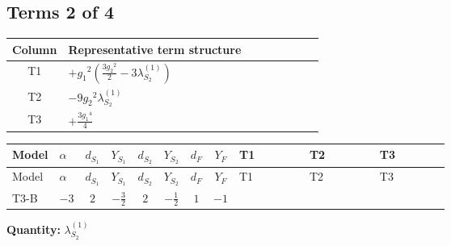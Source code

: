 \documentclass[8pt]{article}
\begin{document}
\begin{landscape}
\subsection*{Terms 2 of 4}
\begin{center}
\begin{tabular}{@{}c >{\raggedright\arraybackslash}p{0.82\linewidth}@{}}
\toprule
Column & Representative term structure \\
\midrule
T1 & \(\displaystyle +{g_1}^2 \left(\frac{3 {g_2}^2}{2}-3 {\lambda_{S_2}^{(1)}}\right)\) \\
\midrule
T2 & \(\displaystyle -9 {g_2}^2 {\lambda_{S_2}^{(1)}}\) \\
\midrule
T3 & \(\displaystyle +\frac{3 {g_1}^4}{4}\) \\
\midrule
\bottomrule
\end{tabular}
\end{center}
\smallskip
\tiny
\begin{longtable}{@{}llcccccc >{\raggedright\arraybackslash}p{0.21\linewidth} >{\raggedright\arraybackslash}p{0.21\linewidth} >{\raggedright\arraybackslash}p{0.21\linewidth}@{}}
\toprule
Model & $\alpha$ & $d_{S_1}$ & $Y_{S_1}$ & $d_{S_2}$ & $Y_{S_2}$ & $d_F$ & $Y_F$ & T1 & T2 & T3 \\
\midrule
\endfirsthead
\toprule
Model & $\alpha$ & $d_{S_1}$ & $Y_{S_1}$ & $d_{S_2}$ & $Y_{S_2}$ & $d_F$ & $Y_F$ & T1 & T2 & T3 \\
\midrule
\endhead
T3-B & $-3$ & $2$ & $-\frac{3}{2}$ & $2$ & $-\frac{1}{2}$ & $1$ & $-1$ & \scriptsize\adjustbox{max width=\linewidth}{$\begin{gathered} +{g_1}^2 \left(\frac{3 {g_2}^2}{2}-3 {\lambda_{S_2}^{(1)}}\right)\end{gathered}$} & \scriptsize\adjustbox{max width=\linewidth}{$\begin{gathered} -9 {g_2}^2 {\lambda_{S_2}^{(1)}}\end{gathered}$} & \scriptsize\adjustbox{max width=\linewidth}{$\begin{gathered} +\frac{3 {g_1}^4}{4}\end{gathered}$} \\
\midrule
\bottomrule
\end{longtable}
\clearpage
\noindent\textbf{Quantity: }$\lambda_{S_2}^{(1)}$\par\smallskip

\end{landscape}
\end{document}
